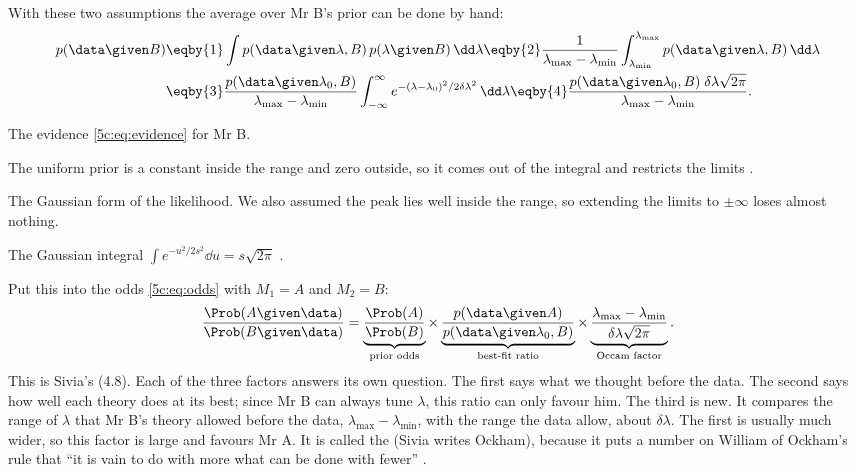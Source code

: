 With these two assumptions the average over Mr B's prior can be done by hand:
\begin{align}
  p(\data\given B)
  &\eqby{1}\int p(\data\given\lambda,B)\,p(\lambda\given B)\,\dd\lambda
   \eqby{2}\frac{1}{\lambda_{\max}-\lambda_{\min}}
     \int_{\lambda_{\min}}^{\lambda_{\max}}p(\data\given\lambda,B)\,\dd\lambda \nonumber\\
  &\eqby{3}\frac{p(\data\given\lambda_0,B)}{\lambda_{\max}-\lambda_{\min}}
     \int_{-\infty}^{\infty}e^{-(\lambda-\lambda_0)^2/2\delta\lambda^2}\,\dd\lambda
   \eqby{4}\frac{p(\data\given\lambda_0,B)\;\delta\lambda\sqrt{2\pi}}{\lambda_{\max}-\lambda_{\min}} .
  \label{5c:eq:mrb}
\end{align}
\begin{explain}
  \item The evidence \eqref{5c:eq:evidence} for Mr B.
  \item The uniform prior is a constant inside the range and zero outside, so it comes
        out of the integral and restricts the limits .
  \item The Gaussian form of the likelihood. We also assumed the peak lies well inside
        the range, so extending the limits to $\pm\infty$ loses almost nothing.
  \item The Gaussian integral $\int e^{-u^2/2s^2}\dd u=s\sqrt{2\pi}$ .
\end{explain}
Put this into the odds \eqref{5c:eq:odds} with $M_1=A$ and $M_2=B$:
\begin{equation}
  \frac{\Prob(A\given\data)}{\Prob(B\given\data)}
  =\underbrace{\frac{\Prob(A)}{\Prob(B)}}_{\text{prior odds}}
   \times\underbrace{\frac{p(\data\given A)}{p(\data\given\lambda_0,B)}}_{\text{best-fit ratio}}
   \times\underbrace{\frac{\lambda_{\max}-\lambda_{\min}}{\delta\lambda\sqrt{2\pi}}}_{\text{Occam factor}} .
  \label{5c:eq:ockham}
\end{equation}
This is Sivia's (4.8). Each of the three factors answers its own question. The first
says what we thought before the data. The second says how well each theory does at
its best; since Mr B can always tune $\lambda$, this ratio can only favour him. The
third is new. It compares the range of $\lambda$ that Mr B's theory allowed before the
data, $\lambda_{\max}-\lambda_{\min}$, with the range the data allow, about
$\delta\lambda$. The first is usually much wider, so this factor is large and favours
Mr A. It is called the
 (Sivia writes Ockham), because it puts a number on William of
Ockham's rule that ``it is vain to do with more what can be done with fewer''
.

